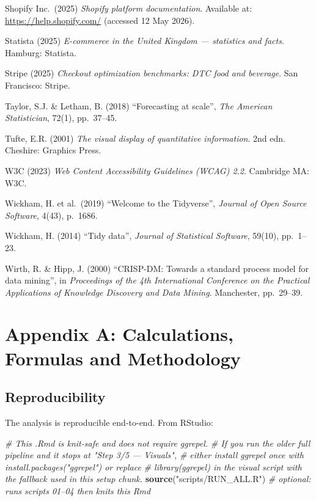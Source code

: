 \documentclass[
  11pt,
]{article}
\newenvironment{Shaded}{\begin{snugshade}}{\end{snugshade}}
\newcommand{\CommentTok}[1]{\textcolor[rgb]{0.56,0.35,0.01}{\textit{#1}}}
\newcommand{\FunctionTok}[1]{\textcolor[rgb]{0.13,0.29,0.53}{\textbf{#1}}}
\newcommand{\NormalTok}[1]{#1}
\newcommand{\StringTok}[1]{\textcolor[rgb]{0.31,0.60,0.02}{#1}}
\begin{document}
Shopify Inc.~(2025) \emph{Shopify platform documentation}. Available at:
\url{https://help.shopify.com/} (accessed 12 May 2026).

Statista (2025) \emph{E-commerce in the United Kingdom --- statistics
and facts}. Hamburg: Statista.

Stripe (2025) \emph{Checkout optimization benchmarks: DTC food and
beverage}. San Francisco: Stripe.

Taylor, S.J. \& Letham, B. (2018) ``Forecasting at scale'', \emph{The
American Statistician}, 72(1), pp.~37--45.

Tufte, E.R. (2001) \emph{The visual display of quantitative
information}. 2nd edn. Cheshire: Graphics Press.

W3C (2023) \emph{Web Content Accessibility Guidelines (WCAG) 2.2}.
Cambridge MA: W3C.

Wickham, H. et al.~(2019) ``Welcome to the Tidyverse'', \emph{Journal of
Open Source Software}, 4(43), p.~1686.

Wickham, H. (2014) ``Tidy data'', \emph{Journal of Statistical
Software}, 59(10), pp.~1--23.

Wirth, R. \& Hipp, J. (2000) ``CRISP-DM: Towards a standard process
model for data mining'', in \emph{Proceedings of the 4th International
Conference on the Practical Applications of Knowledge Discovery and Data
Mining}. Manchester, pp.~29--39.

\newpage

\section{Appendix A: Calculations, Formulas and
Methodology}\label{appendix-a-calculations-formulas-and-methodology}

\subsection{Reproducibility}\label{reproducibility}

The analysis is reproducible end-to-end. From RStudio:

\begin{Shaded}
\begin{Highlighting}[]
\CommentTok{\# This .Rmd is knit{-}safe and does not require ggrepel.}
\CommentTok{\# If you run the older full pipeline and it stops at "Step 3/5 — Visuals",}
\CommentTok{\# either install ggrepel once with install.packages("ggrepel") or replace}
\CommentTok{\# library(ggrepel) in the visual script with the fallback used in this setup chunk.}
\FunctionTok{source}\NormalTok{(}\StringTok{"scripts/RUN\_ALL.R"}\NormalTok{)   }\CommentTok{\# optional: runs scripts 01–04 then knits this Rmd}
\end{Highlighting}
\end{Shaded}
\end{document}
